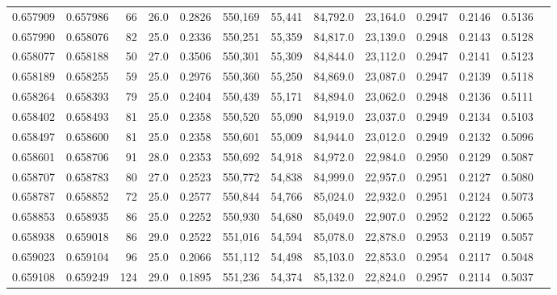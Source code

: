 \begin{tabular}{rrrrrrrrrrrrr}
0.657909 & 0.657986 &    66 & 26.0 &                                     0.2826 & 550,169 &  55,441 &  84,792.0 &  23,164.0 & 0.2947 & 0.2146 & 0.5136 \\
0.657990 & 0.658076 &    82 & 25.0 &                                     0.2336 & 550,251 &  55,359 &  84,817.0 &  23,139.0 & 0.2948 & 0.2143 & 0.5128 \\
0.658077 & 0.658188 &    50 & 27.0 &                                     0.3506 & 550,301 &  55,309 &  84,844.0 &  23,112.0 & 0.2947 & 0.2141 & 0.5123 \\
0.658189 & 0.658255 &    59 & 25.0 &                                     0.2976 & 550,360 &  55,250 &  84,869.0 &  23,087.0 & 0.2947 & 0.2139 & 0.5118 \\
0.658264 & 0.658393 &    79 & 25.0 &                                     0.2404 & 550,439 &  55,171 &  84,894.0 &  23,062.0 & 0.2948 & 0.2136 & 0.5111 \\
0.658402 & 0.658493 &    81 & 25.0 &                                     0.2358 & 550,520 &  55,090 &  84,919.0 &  23,037.0 & 0.2949 & 0.2134 & 0.5103 \\
0.658497 & 0.658600 &    81 & 25.0 &                                     0.2358 & 550,601 &  55,009 &  84,944.0 &  23,012.0 & 0.2949 & 0.2132 & 0.5096 \\
0.658601 & 0.658706 &    91 & 28.0 &                                     0.2353 & 550,692 &  54,918 &  84,972.0 &  22,984.0 & 0.2950 & 0.2129 & 0.5087 \\
0.658707 & 0.658783 &    80 & 27.0 &                                     0.2523 & 550,772 &  54,838 &  84,999.0 &  22,957.0 & 0.2951 & 0.2127 & 0.5080 \\
0.658787 & 0.658852 &    72 & 25.0 &                                     0.2577 & 550,844 &  54,766 &  85,024.0 &  22,932.0 & 0.2951 & 0.2124 & 0.5073 \\
0.658853 & 0.658935 &    86 & 25.0 &                                     0.2252 & 550,930 &  54,680 &  85,049.0 &  22,907.0 & 0.2952 & 0.2122 & 0.5065 \\
0.658938 & 0.659018 &    86 & 29.0 &                                     0.2522 & 551,016 &  54,594 &  85,078.0 &  22,878.0 & 0.2953 & 0.2119 & 0.5057 \\
0.659023 & 0.659104 &    96 & 25.0 &                                     0.2066 & 551,112 &  54,498 &  85,103.0 &  22,853.0 & 0.2954 & 0.2117 & 0.5048 \\
0.659108 & 0.659249 &   124 & 29.0 &                                     0.1895 & 551,236 &  54,374 &  85,132.0 &  22,824.0 & 0.2957 & 0.2114 & 0.5037 \\

\end{tabular}
